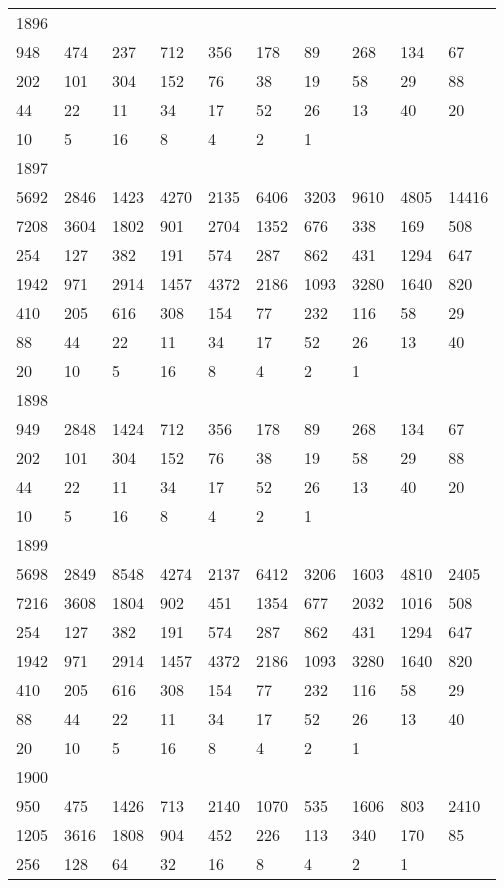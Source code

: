 \begin{longtable}{*{10}{l}}
1896&&&&&&&&&\\
948& 474& 237& 712& 356& 178& 89& 268& 134& 67\\
202& 101& 304& 152& 76& 38& 19& 58& 29& 88\\
44& 22& 11& 34& 17& 52& 26& 13& 40& 20\\
10& 5& 16& 8& 4& 2& 1& \\

1897&&&&&&&&&\\
5692& 2846& 1423& 4270& 2135& 6406& 3203& 9610& 4805& 14416\\
7208& 3604& 1802& 901& 2704& 1352& 676& 338& 169& 508\\
254& 127& 382& 191& 574& 287& 862& 431& 1294& 647\\
1942& 971& 2914& 1457& 4372& 2186& 1093& 3280& 1640& 820\\
410& 205& 616& 308& 154& 77& 232& 116& 58& 29\\
88& 44& 22& 11& 34& 17& 52& 26& 13& 40\\
20& 10& 5& 16& 8& 4& 2& 1& \\

1898&&&&&&&&&\\
949& 2848& 1424& 712& 356& 178& 89& 268& 134& 67\\
202& 101& 304& 152& 76& 38& 19& 58& 29& 88\\
44& 22& 11& 34& 17& 52& 26& 13& 40& 20\\
10& 5& 16& 8& 4& 2& 1& \\

1899&&&&&&&&&\\
5698& 2849& 8548& 4274& 2137& 6412& 3206& 1603& 4810& 2405\\
7216& 3608& 1804& 902& 451& 1354& 677& 2032& 1016& 508\\
254& 127& 382& 191& 574& 287& 862& 431& 1294& 647\\
1942& 971& 2914& 1457& 4372& 2186& 1093& 3280& 1640& 820\\
410& 205& 616& 308& 154& 77& 232& 116& 58& 29\\
88& 44& 22& 11& 34& 17& 52& 26& 13& 40\\
20& 10& 5& 16& 8& 4& 2& 1& \\

1900&&&&&&&&&\\
950& 475& 1426& 713& 2140& 1070& 535& 1606& 803& 2410\\
1205& 3616& 1808& 904& 452& 226& 113& 340& 170& 85\\
256& 128& 64& 32& 16& 8& 4& 2& 1& \\


\end{longtable}
